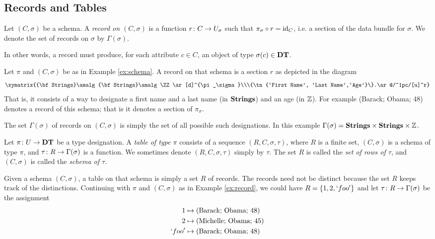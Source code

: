 \documentclass{amsart}
\def\DT{{\bf DT}}
\def\Strings{{\bf Strings}}
\begin{document}
\subsection{Records and Tables}

\begin{definition}

Let $(C,\sigma)$ be a schema.  A {\em record on $(C,\sigma)$} is a function $r\colon C\rightarrow U_\sigma$ such that $\pi_\sigma\circ r=\textnormal{id}_C$, i.e. a section of the data bundle for $\sigma$.  We denote the set of records on $\sigma$ by $\Gamma(\sigma)$.

\end{definition}

In other words, a record must produce, for each attribute $c\in C$, an object of type $\sigma(c)\in\DT$.  

\begin{example}\label{ex:record}

Let $\pi$ and $(C,\sigma)$ be as in Example \ref{ex:schema}.  A record on that schema is a section $r$ as depicted in the diagram $$\xymatrix{\Strings\amalg\Strings\amalg\ZZ\ar[d]^{\pi_\sigma}\\\{\tn{`First Name', `Last Name',`Age'}\}.\ar@/^1pc/[u]^r}$$  That is, it consists of a way to designate a first name and a last name (in $\Strings$) and an age (in ${\mathbb Z}$).  For example (Barack; Obama; 48) denotes a record of this schema; that is it denotes a section of $\pi_\sigma$.

The set $\Gamma(\sigma)$ of records on $(C,\sigma)$ is simply the set of all possible such designations.  In this example $\Gamma(\sigma)=\Strings\cross\Strings\cross\ZZ$.

\end{example}

\begin{definition}

Let $\pi\taking U\to\DT$ be a type designation.  A {\em table of type $\pi$} consists of a sequence $(R,C,\sigma,\tau)$, where $R$ is a finite set, $(C,\sigma)$ is a schema of type $\pi$,  and $\tau\colon R\rightarrow\Gamma(\sigma)$ is a function.  We sometimes denote $(R,C,\sigma,\tau)$ simply by $\tau$.  The set $R$ is called the {\em set of rows of $\tau$}, and $(C,\sigma)$ is called the {\em schema of $\tau$}.

\end{definition}

\begin{example}\label{ex:table}

Given a schema $(C,\sigma)$, a table on that schema is simply a set $R$ of records.  The records need not be distinct because the set $R$ keeps track of the distinctions.  Continuing with $\pi$ and $(C,\sigma)$ as in Example \ref{ex:record}, we could have $R=\{1,2,`foo'\}$ and let $\tau\colon R\rightarrow\Gamma(\sigma)$ be the assignment \begin{align*} 1&\mapsto \textnormal{(Barack; Obama; 48)}\\2&\mapsto \textnormal{(Michelle; Obama; 45)}\\ `foo'&\mapsto\textnormal{(Barack; Obama; 48)}\end{align*}

\end{example}
\end{document}
